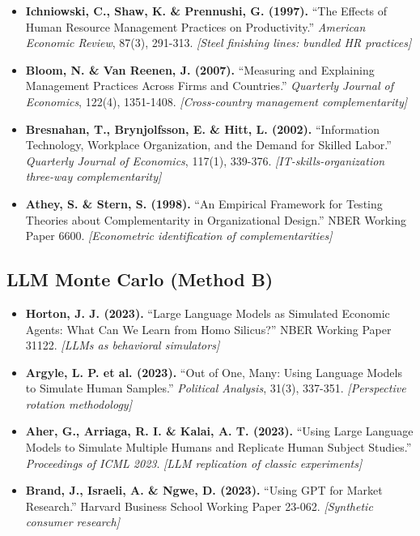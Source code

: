 \documentclass[11pt,a4paper]{article}
\theoremstyle{definition}
\begin{document}
\begin{itemize}

\item \textbf{Ichniowski, C., Shaw, K. \& Prennushi, G. (1997).} 
``The Effects of Human Resource Management Practices on Productivity.'' 
\textit{American Economic Review}, 87(3), 291-313.
\textit{[Steel finishing lines: bundled HR practices]}

\item \textbf{Bloom, N. \& Van Reenen, J. (2007).} 
``Measuring and Explaining Management Practices Across Firms and Countries.'' 
\textit{Quarterly Journal of Economics}, 122(4), 1351-1408.
\textit{[Cross-country management complementarity]}

\item \textbf{Bresnahan, T., Brynjolfsson, E. \& Hitt, L. (2002).} 
``Information Technology, Workplace Organization, and the Demand for Skilled Labor.'' 
\textit{Quarterly Journal of Economics}, 117(1), 339-376.
\textit{[IT-skills-organization three-way complementarity]}

\item \textbf{Athey, S. \& Stern, S. (1998).} 
``An Empirical Framework for Testing Theories about Complementarity in Organizational Design.'' 
NBER Working Paper 6600.
\textit{[Econometric identification of complementarities]}

\end{itemize}

\subsection{LLM Monte Carlo (Method B)}

\begin{itemize}

\item \textbf{Horton, J. J. (2023).} 
``Large Language Models as Simulated Economic Agents: What Can We Learn from Homo Silicus?'' 
NBER Working Paper 31122.
\textit{[LLMs as behavioral simulators]}

\item \textbf{Argyle, L. P. et al. (2023).} 
``Out of One, Many: Using Language Models to Simulate Human Samples.'' 
\textit{Political Analysis}, 31(3), 337-351.
\textit{[Perspective rotation methodology]}

\item \textbf{Aher, G., Arriaga, R. I. \& Kalai, A. T. (2023).} 
``Using Large Language Models to Simulate Multiple Humans and Replicate Human Subject Studies.'' 
\textit{Proceedings of ICML 2023}.
\textit{[LLM replication of classic experiments]}

\item \textbf{Brand, J., Israeli, A. \& Ngwe, D. (2023).} 
``Using GPT for Market Research.'' 
Harvard Business School Working Paper 23-062.
\textit{[Synthetic consumer research]}

\end{itemize}
\end{document}
